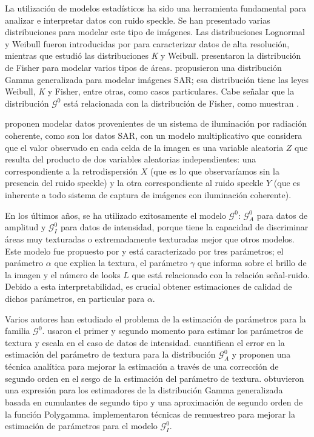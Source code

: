 La utilización de modelos estadísticos ha sido una herramienta fundamental para analizar e interpretar datos con ruido speckle. 
Se han presentado varias distribuciones para modelar este tipo de imágenes. Las distribuciones Lognormal y Weibull fueron introducidas por \citet{oliverquegan98} para caracterizar datos de alta resolución, mientras que \citet{Oliver1993} estudió las distribuciones \textit{K} y Weibull. 
\citet{Tison2004} presentaron la distribución de Fisher para modelar varios tipos de áreas. 
\citet{Li2011} propusieron una distribución Gamma generalizada para modelar imágenes SAR; esa distribución tiene las leyes Weibull, \textit{K} y Fisher, entre otras, como casos particulares. 
Cabe señalar que la distribución $\mathcal{G}^0$ está relacionada con la distribución de Fisher, como muestran \citet{MejailJacoboFreryBustos:IJRS}.

\citet{oliverquegan98} proponen modelar datos provenientes de un sistema de iluminación por radiación coherente, como son los datos SAR, con un modelo multiplicativo que considera que el valor observado en cada celda de la imagen es una variable aleatoria $Z$ que resulta del producto de dos variables aleatorias independientes: una correspondiente a la retrodispersión $X$ (que es lo que observaríamos sin la presencia del ruido speckle) y la otra correspondiente al ruido speckle $Y$ (que es inherente a todo sistema de captura de imágenes con iluminación coherente). 

En los últimos años, se ha utilizado exitosamente el modelo $\mathcal{G}^0$: $\mathcal{G}_A^0$ para datos de amplitud y $\mathcal G_I^0$ para datos de intensidad, porque tiene la capacidad de discriminar áreas muy texturadas o extremadamente texturadas mejor que otros modelos. Este modelo fue propuesto por \citet{Frery97} y está caracterizado por tres parámetros; el parámetro $\alpha$ que explica la textura, el parámetro $\gamma $ que informa sobre el brillo de la imagen y el número de looks $L$ que está relacionado con la relación señal-ruido.
Debido a esta interpretabilidad, es crucial obtener estimaciones de calidad de dichos parámetros, en particular para $\alpha$.

Varios autores han estudiado el problema de la estimación de parámetros para la familia $\mathcal G^0$. \citet{Freitas2005} usaron el primer y segundo momento para estimar los parámetros de textura y escala en el caso de datos de intensidad.
 \citet{VasconcellosFrerySilva:CompStat} cuantifican el error en la estimación del parámetro de textura para la distribución $\mathcal G_A^0$ y proponen una técnica analítica para mejorar la estimación a través de una corrección de segundo orden en el sesgo de la estimación del parámetro de textura. \citet{Li2011} obtuvieron una expresión para los estimadores de la distribución Gamma generalizada basada en cumulantes de segundo tipo y una aproximación de segundo orden de la función Polygamma. \citet{CribariFrerySilva:CSDA} implementaron técnicas de remuestreo para mejorar la estimación de parámetros para el modelo $\mathcal G_I^0$.

